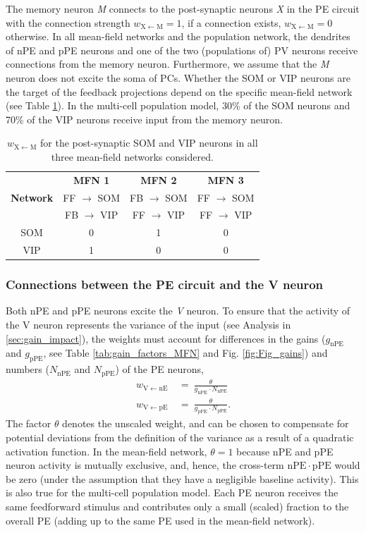 \documentclass[10pt,a4paper]{article}
\begin{document}
The memory neuron \textit{M} connects to the post-synaptic neurons \textit{X} in the PE circuit with the connection strength $w_\mathrm{X\leftarrow M} = 1$, if a connection exists, $w_\mathrm{X\leftarrow M} = 0$ otherwise. In all mean-field networks and the population network, the dendrites of nPE and pPE neurons and one of the two (populations of) PV neurons receive connections from the memory neuron. Furthermore, we assume that the \textit{M} neuron does not excite the soma of PCs. Whether the SOM or VIP neurons are the target of the feedback projections depend on the specific mean-field network (see Table \ref{tab:wXM}). In the multi-cell population model, 30\% of the SOM neurons and 70\% of the VIP neurons receive input from the memory neuron.
%
\begin{table}[h!]
\centering
\begin{tabular}{ |c|c|c|c|  }
\hline
 & \textbf{MFN 1} & \textbf{MFN 2} & \textbf{MFN 3}  \\
\textbf{Network} & FF $\rightarrow$ SOM  & FB $\rightarrow$ SOM  & FF $\rightarrow$ SOM  \\
 & FB $\rightarrow$ VIP  & FF $\rightarrow$ VIP  & FF $\rightarrow$ VIP  \\
\hline
\hline
SOM & 0 & 1 & 0\\
VIP & 1 & 0 & 0 \\
\hline
\end{tabular}
\caption{\footnotesize{$w_\mathrm{X\leftarrow M}$ for the post-synaptic SOM and VIP neurons in all three mean-field networks considered.}}
\label{tab:wXM}
\end{table}
%

\subsubsection{Connections between the PE circuit and the V neuron}
%
Both nPE and pPE neurons excite the \textit{V} neuron. To ensure that the activity of the V neuron represents the variance of the input (see Analysis in \ref{sec:gain_impact}), the weights must account for differences in the gains ($g_\mathrm{nPE}$ and $g_\mathrm{pPE}$, see Table \ref{tab:gain_factors_MFN} and Fig. \ref{fig:Fig_gains}) and numbers ($N_\mathrm{nPE}$ and $N_\mathrm{pPE}$) of the PE neurons,
%
\begin{align*}
w_\mathrm{V\leftarrow nE}\  &=\ \frac{\theta}{g_\mathrm{nPE} \cdot N_\mathrm{nPE}} \nonumber\\
w_\mathrm{V\leftarrow pE}\  &=\ \frac{\theta}{g_\mathrm{pPE} \cdot N_\mathrm{pPE}}.
\end{align*}
%
The factor $\theta$ denotes the unscaled weight, and can be chosen to compensate for potential  deviations from the definition of the variance as a result of a quadratic activation function. In the mean-field network, $\theta = 1$ because nPE and pPE neuron activity is mutually exclusive, and, hence, the cross-term $\mathrm{nPE}\cdot\mathrm{pPE}$ would be zero (under the assumption that they have a negligible baseline activity). This is also true for the multi-cell population model. Each PE neuron receives the same feedforward stimulus and contributes only a small (scaled) fraction to the overall PE (adding up to the same PE used in the mean-field network).
\end{document}
